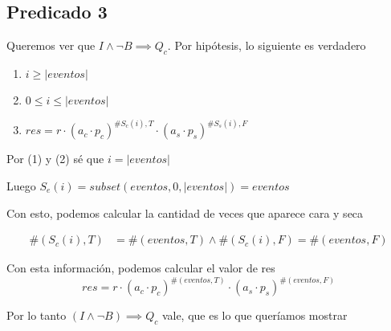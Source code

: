 \documentclass[../document.tex]{subfiles}
\begin{document}
\subsection*{Predicado 3}

Queremos ver que $I\land \neg B \implies Q_c$. Por hipótesis, lo siguiente es verdadero

\begin{enumerate}
    \item $i \geq |eventos|$
    \item $0\leq i \leq |eventos|$
    \item $res=r\cdot (a_c\cdot p_c)^{\#S_c(i),T}\cdot (a_s\cdot p_s)^{\#S_s(i),F}$
\end{enumerate}

Por (1) y (2) sé que $i=|eventos|$

Luego $S_e(i)=subset(eventos, 0, |eventos|)=eventos$

Con esto, podemos calcular la cantidad de veces que aparece cara y seca 

\begin{equation}
\begin{split}
    \#(S_c(i),T)&=\#(eventos,T)\land \#(S_c(i),F)=\#(eventos,F)
\end{split}
\end{equation}

Con esta información, podemos calcular el valor de res
\begin{equation}
res=r\cdot (a_c\cdot p_c)^{\#(eventos,T)}\cdot (a_s\cdot p_s)^{\#(eventos,F)}
\end{equation}

Por lo tanto $(I\land \neg B)\implies Q_c$ vale, que es lo que queríamos mostrar
\end{document}
